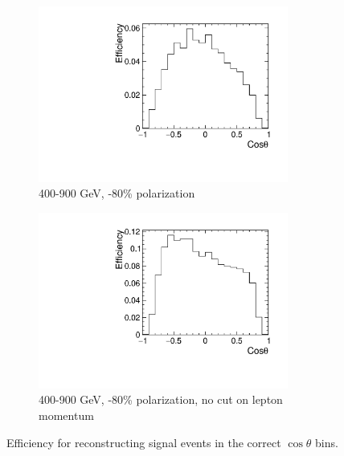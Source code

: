 \begin{figure}
  \centering
  \begin{subfigure}{.5\textwidth}
    \centering
    \includegraphics[width=0.9\textwidth]{TopAnalysis/figures/efficiency_LowE.pdf}
    \caption{400-900 GeV, -80\% polarization}
  \end{subfigure}%
  \begin{subfigure}{.5\textwidth}
    \centering
    \includegraphics[width=0.9\textwidth]{TopAnalysis/figures/efficiency_LowE_NoLepCut.pdf}
    \caption{400-900 GeV, -80\% polarization, no cut on lepton momentum}
  \end{subfigure}
  \caption{Efficiency for reconstructing signal events in the correct $\cos\theta$ bins.}
  \label{fig:sigefficienciesb}
\end{figure}

